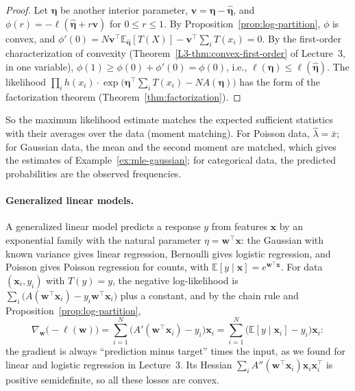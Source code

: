 \documentclass[11pt]{article}
\newcommand{\E}{\mathbb{E}}
\theoremstyle{definition}
\theoremstyle{plain}
\theoremstyle{remark}
\begin{document}
\begin{proof}
    Let $\boldsymbol{\eta}$ be another interior parameter, $\mathbf{v} = \boldsymbol{\eta} - \hat{\boldsymbol{\eta}}$, and $\phi(r) = -\ell(\hat{\boldsymbol{\eta}} + r\mathbf{v})$ for $0 \leq r \leq 1$. By Proposition~\ref{prop:log-partition}, $\phi$ is convex, and $\phi'(0) = N\mathbf{v}^\top\E_{\hat{\boldsymbol{\eta}}}[T(X)] - \mathbf{v}^\top\sum_i T(x_i) = 0$. By the first-order characterization of convexity (Theorem~\ref{L3-thm:convex-first-order} of Lecture~3, in one variable), $\phi(1) \geq \phi(0) + \phi'(0) = \phi(0)$, i.e., $\ell(\boldsymbol{\eta}) \leq \ell(\hat{\boldsymbol{\eta}})$. The likelihood $\prod_i h(x_i) \cdot \exp\big(\boldsymbol{\eta}^\top\sum_i T(x_i) - NA(\boldsymbol{\eta})\big)$ has the form of the factorization theorem (Theorem~\ref{thm:factorization}).
\end{proof}

So the maximum likelihood estimate matches the expected sufficient statistics with their averages over the data (moment matching). For Poisson data, $\hat\lambda = \bar x$; for Gaussian data, the mean and the second moment are matched, which gives the estimates of Example~\ref{ex:mle-gaussian}; for categorical data, the predicted probabilities are the observed frequencies.

\paragraph{Generalized linear models.} A generalized linear model predicts a response $y$ from features $\mathbf{x}$ by an exponential family with the natural parameter $\eta = \mathbf{w}^\top\mathbf{x}$: the Gaussian with known variance gives linear regression, Bernoulli gives logistic regression, and Poisson gives Poisson regression for counts, with $\E[y \mid \mathbf{x}] = e^{\mathbf{w}^\top\mathbf{x}}$. For data $(\mathbf{x}_i, y_i)$ with $T(y) = y$, the negative log-likelihood is $\sum_i \big(A(\mathbf{w}^\top\mathbf{x}_i) - y_i\mathbf{w}^\top\mathbf{x}_i\big)$ plus a constant, and by the chain rule and Proposition~\ref{prop:log-partition},
\[\nabla_{\mathbf{w}}\big(-\ell(\mathbf{w})\big) = \sum_{i=1}^N \big(A'(\mathbf{w}^\top\mathbf{x}_i) - y_i\big)\mathbf{x}_i = \sum_{i=1}^N \big(\E[y \mid \mathbf{x}_i] - y_i\big)\mathbf{x}_i:\]
the gradient is always ``prediction minus target'' times the input, as we found for linear and logistic regression in Lecture~3. Its Hessian $\sum_i A''(\mathbf{w}^\top\mathbf{x}_i)\mathbf{x}_i\mathbf{x}_i^\top$ is positive semidefinite, so all these losses are convex.
\end{document}
